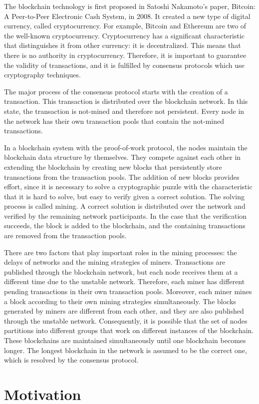 The blockchain technology is first proposed in Satoshi Nakamoto’s paper, Bitcoin: A Peer-to-Peer Electronic Cash System, in 2008. It created a new type of digital currency, called cryptocurrency. For example, Bitcoin and Ethereum are two of the well-known cryptocurrency. Cryptocurrency has a significant characteristic that distinguishes it from other currency: it is decentralized. This means that there is no authority in cryptocurrency. Therefore, it is important to guarantee the validity of transactions, and it is fulfilled by consensus protocols which use cryptography techniques.

The major process of the consensus protocol starts with the creation of a transaction. This transaction is distributed over the blockchain network. In this state, the transaction is not-mined and therefore not persistent. Every node in the network has their own transaction pools that contain the not-mined transactions.

In a blockchain system with the proof-of-work protocol, the nodes maintain the blockchain data structure by themselves. They compete against each other in extending the blockchain by creating new blocks that persistently store transactions from the transaction pools. The addition of new blocks provides effort, since it is necessary to solve a cryptographic puzzle with the characteristic that it is hard to solve, but easy to verify given a correct solution. The solving process is called mining. A correct solution is distributed over the network and verified by the remaining network participants. In the case that the verification succeeds, the block is added to the blockchain, and the containing transactions are removed from the transaction pools.

There are two factors that play important roles in the mining processes: the delays of networks and the mining strategies of miners. Transactions are published through the blockchain network, but each node receives them at a different time due to the unstable network. Therefore, each miner has different pending transactions in their own transaction pools. Moreover, each miner mines a block according to their own mining strategies simultaneously. The blocks generated by miners are different from each other, and they are also published through the unstable network. Consequently, it is possible that the set of nodes partitions into different groups that work on different instances of the blockchain. These blockchains are maintained simultaneously until one blockchain becomes longer. The longest blockchain in the network is assumed to be the correct one, which is resolved by the consensus protocol.

\section{Motivation}
